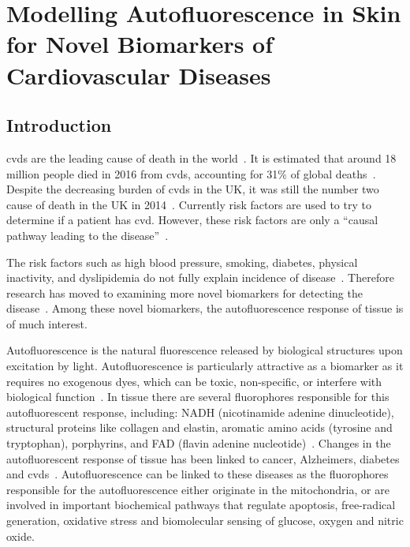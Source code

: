 \chapter{Modelling Autofluorescence in Skin for Novel Biomarkers of Cardiovascular Diseases}
\label{chap:salvo}




\section{Introduction}
\label{sec:salvointro}

\Gls*{cvds} are the leading cause of death in the world~\cite{whodeath}.
It is estimated that around 18 million people died in 2016 from \gls*{cvds}, accounting for 31\% of global deaths~\cite{whodeath}.
Despite the decreasing burden of \gls*{cvds} in the UK, it was still the number two cause of death in the UK in 2014~\cite{bhatnagar2016trends}.
Currently risk factors are used to try to determine if a patient has \gls*{cvd}.
However, these risk factors are only a ``causal pathway leading to the disease''~\cite{vasan2006biomarkers}.

The risk factors such as high blood pressure, smoking, diabetes, physical inactivity, and dyslipidemia do not fully explain incidence of disease~\cite{olsen2010assessment,folsom2013classical}.
Therefore research has moved to examining more novel biomarkers for detecting the disease~\cite{melander2009novel,gerszten2008search,wang2017novel}.
Among these novel biomarkers, the autofluorescence response of tissue is of much interest.

Autofluorescence is the natural fluorescence released by biological structures upon excitation by light.
Autofluorescence is particularly attractive as a biomarker as it requires no exogenous dyes, which can be toxic, non-specific, or interfere with biological function~\cite{kollias1998endogenous}.
In tissue there are several fluorophores responsible for this autofluorescent response, including: NADH (nicotinamide adenine dinucleotide), structural proteins like collagen and elastin, aromatic amino acids (tyrosine and tryptophan), porphyrins, and FAD (flavin adenine nucleotide)~\cite{monici2005cell}.
Changes in the autofluorescent response of tissue has been linked to cancer, Alzheimers, diabetes and \gls*{cvds}~\cite{drakaki2009laser,pu2013native,ramanujam2000fluorescence,tarnawska2018pilot,van2019skin}.
Autofluorescence can be linked to these diseases as the fluorophores responsible for the autofluorescence either originate in the mitochondria, or are involved in important biochemical pathways that regulate apoptosis, free-radical generation, oxidative stress and biomolecular sensing of glucose, oxygen and nitric oxide.

